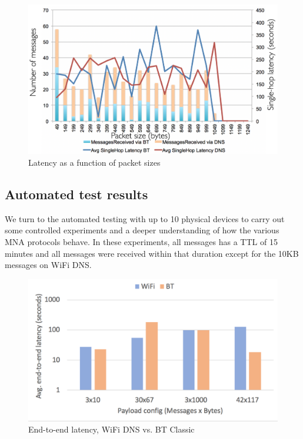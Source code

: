 \documentclass[conference]{IEEEtran}
\begin{document}
\begin{figure}[htbp]
\centerline{\includegraphics[width=\columnwidth]{figs/romania_latency}}
\caption{Latency as a function of packet sizes}
\label{fig:romania_lat}
\end{figure}


%
\subsection{Automated test results}
\label{sec:automated}
%
We turn to the automated testing with up to 10 physical devices to
carry out some controlled experiments and a deeper understanding of
how the various MNA protocols behave. In these experiments, all
messages has a TTL of 15 minutes and all messages were received within
that duration except for the 10KB messages on WiFi DNS.
%
\begin{figure}[htbp]
\centerline{\includegraphics[width=0.8\columnwidth]{figs/variety_e2e_latency}}
\caption{End-to-end latency, WiFi DNS vs. BT Classic}
\label{fig:variety_e2e}
\end{figure}
%
\end{document}
